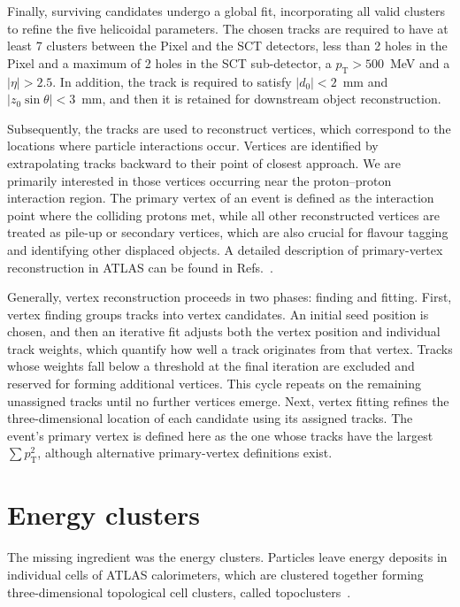 Finally, surviving candidates undergo a global fit, incorporating all valid clusters to refine the five helicoidal parameters. The chosen tracks are required to have at least 7 clusters between the Pixel and the SCT detectors, less than 2 holes in the Pixel and a maximum of 2 holes in the SCT sub-detector, a $p_{\text{T}} > 500$~MeV and a $|\eta|>2.5$. In addition, the track is required to satisfy $|d_0|<2$~mm and $|z_0\sin\theta|<3$~mm, and then it is retained for downstream object reconstruction.

Subsequently, the tracks are used to reconstruct vertices, which correspond to the locations where particle interactions occur. Vertices are identified by extrapolating tracks backward to their point of closest approach. We are primarily interested in those vertices occurring near the proton–proton interaction region. The primary vertex of an event is defined as the interaction point where the colliding protons met, while all other reconstructed vertices are treated as pile-up or secondary vertices, which are also crucial for 
flavour tagging and identifying other displaced objects. A detailed description of primary-vertex reconstruction in ATLAS can be found in Refs.~\cite{vertex_run1,vertex_run2,vertex_run3}.

Generally, vertex reconstruction proceeds in two phases: finding and fitting. First, vertex finding groups tracks into vertex candidates. An initial seed position is chosen, and then an iterative fit adjusts both the vertex position and individual track weights, which quantify how well a track originates from that vertex. Tracks whose weights fall below a threshold at the final iteration are excluded and reserved for forming additional vertices. This cycle repeats on the remaining unassigned tracks until no further vertices emerge. 
Next, vertex fitting refines the three-dimensional location of each candidate using its assigned tracks. The event’s primary vertex is defined here as the one whose tracks have the largest $\sum p^2_{\text{T}}$, although alternative primary-vertex definitions exist.

\section{Energy clusters}
\label{sec:clusters}

The missing ingredient was the energy clusters. Particles leave energy deposits in individual cells of ATLAS calorimeters, which are clustered together forming three-dimensional topological cell clusters, called topoclusters~\cite{topo}.

